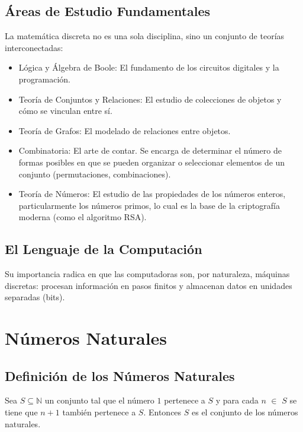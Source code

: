 \documentclass{article}
\begin{document}
\subsection{Áreas de Estudio Fundamentales}
\label{sec:areas-estudio}

La matemática discreta no es una sola disciplina, sino un conjunto de teorías interconectadas:
\begin{itemize}
    \item Lógica y Álgebra de Boole: El fundamento de los circuitos digitales y la programación.
    \item Teoría de Conjuntos y Relaciones: El estudio de colecciones de objetos y cómo se vinculan entre sí.
    \item Teoría de Grafos: El modelado de relaciones entre objetos.
    \item Combinatoria: El arte de contar. Se encarga de determinar el número de formas posibles en que se pueden organizar o seleccionar elementos de un conjunto (permutaciones, combinaciones).
    \item Teoría de Números: El estudio de las propiedades de los números enteros, particularmente los números primos, lo cual es la base de la criptografía moderna (como el algoritmo RSA).
\end{itemize}

\subsection{El Lenguaje de la Computación}
\label{sec:lenguaje-computacion}

Su importancia radica en que las computadoras son, por naturaleza, máquinas discretas: procesan información en pasos finitos y almacenan datos en unidades separadas (bits).

\section{Números Naturales}
\label{sec:numeros-naturales}

\subsection{Definición de los Números Naturales} 
\label{sec:definicion-numeros-naturales}

Sea $S \subseteq \mathbb{N}$ un conjunto tal que el número $1$ pertenece a $S$ y para cada $n$ $\in$ $S$ se tiene que $n+1$ también pertenece a $S$. Entonces $S$ es el conjunto de los números naturales.
\end{document}

